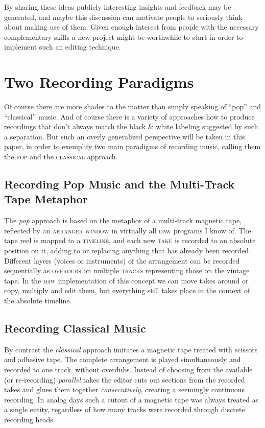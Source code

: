 \documentclass[11pt,a4paper]{article}
\newcommand*{\term}[1]{\textsc{#1}}
\begin{document}
By sharing these ideas publicly interesting insights and
feedback may be generated, and maybe this discussion can motivate people to seriously
think about making use of them.
Given enough interest from people with the necessary complementary skills a new project
might be worthwhile to start in order to implement such an editing technique.

\section{Two Recording Paradigms}

Of course there are more shades to the matter than simply speaking of “pop” and
“classical” music.
And of course there is a variety of approaches how to produce recordings that
don't always match the black \& white labeling suggested by such a separation.
But such an overly generalized perspective will be taken in this paper, in order
to exemplify two main paradigms of recording music, calling them the \term{pop}
and the \term{classical} approach.

\subsection{Recording Pop Music and the Multi-Track Tape Metaphor}

The \emph{pop} approach is based on the metaphor of a multi-track magnetic tape,
reflected by an \term{arranger window} in virtually all \textsc{daw} programs I
know of.
The tape reel is mapped to a \term{timeline}, and each new \term{take} is recorded to
an absolute position on it, adding to or replacing anything that has already
been recorded.
Different layers (voices or instruments) of the arrangement can be recorded
sequentially as \term{overdubs} on multiple \term{tracks} representing those on the
vintage tape.
In the \textsc{daw} implementation of this concept we can move takes around or copy,
multiply and edit them, but everything still takes place in the context of the
absolute timeline.

\subsection{Recording Classical Music}
 
By contrast the \emph{classical} approach imitates a magnetic tape
treated with scissors and adhesive tape.
The complete arrangement is played simultaneously and recorded to one track,
without overdubs.
Instead of choosing from the available (or re-recording) \emph{parallel} takes
the editor cuts out sections from the recorded takes and glues them together
\emph{consecutively}, creating a seemingly continuous recording.
In analog days such a cutout of a magnetic tape was always treated as a single entity,
regardless of how many tracks were recorded through discrete recording heads.
\end{document}
